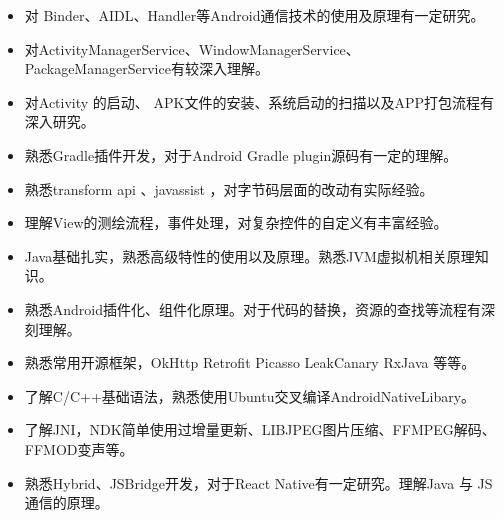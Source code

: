   \begin{itemize}[leftmargin=*]
	\item 对 Binder、AIDL、Handler等Android通信技术的使用及原理有一定研究。
	\item 对ActivityManagerService、WindowManagerService、 PackageManagerService有较深入理解。
	\item 对Activity 的启动、 APK文件的安装、系统启动的扫描以及APP打包流程有深入研究。
	\item 熟悉Gradle插件开发，对于Android Gradle plugin源码有一定的理解。
	\item 熟悉transform api 、javassist ，对字节码层面的改动有实际经验。
	\item 理解View的测绘流程，事件处理，对复杂控件的自定义有丰富经验。
	\item Java基础扎实，熟悉高级特性的使用以及原理。熟悉JVM虚拟机相关原理知识。
	\item 熟悉Android插件化、组件化原理。对于代码的替换，资源的查找等流程有深刻理解。
	\item 熟悉常用开源框架，OkHttp Retrofit Picasso LeakCanary RxJava 等等。 
	\item 了解C/C++基础语法，熟悉使用Ubuntu交叉编译AndroidNativeLibary。
	\item 了解JNI，NDK简单使用过增量更新、LIBJPEG图片压缩、FFMPEG解码、FFMOD变声等。
	\item 熟悉Hybrid、JSBridge开发，对于React Native有一定研究。理解Java 与 JS通信的原理。
  \end{itemize}